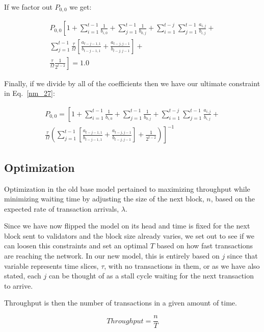 \documentclass[conference]{IEEEtran}
\begin{document}
If we factor out $P_{0,0}$ we get:

\begin{multline}
  P_{0,0} \left[1 +  \sum_{i = 1}^{t-1}{\frac{1}{b_{i,0}}} + \sum_{j = 1}^{t-1}{\frac{1}{b_{0,j}}} + \right.
  \left.\sum_{i=1}^{t-j}{\sum_{j=1}^{t-1}{\frac{a_{i,j}}{b_{i,j}}}} + \right.\\
  \left.\sum_{j=1}^{t-1}{\frac{\tau}{\Omega}\left[\frac{a_{t-j-1,1}}{b_{t-j-1,1}} + \frac{a_{t-j,j-1}}{b_{t-j,j-1}}\right]} + \right.\\
  \left.\frac{\tau}{\Omega}\frac{1}{2^{t-2}}\right] = 1.0 \label{nm_26}
\end{multline}

Finally, if we divide by all of the coefficients then we have our ultimate constraint in Eq.~\ref{nm_27}:

\begin{multline}
  P_{0,0} = \left[1 +  \sum_{i = 1}^{t-1}{\frac{1}{b_{i,0}}} + \sum_{j = 1}^{t-1}{\frac{1}{b_{0,j}}} + 
  \sum_{i=1}^{t-j}{\sum_{j=1}^{t-1}{\frac{a_{i,j}}{b_{i,j}}}} + \right.\\
  \left.\frac{\tau}{\Omega}\left(\sum_{j=1}^{t-1}{\left[\frac{a_{t-j-1,1}}{b_{t-j-1,1}} + \frac{a_{t-j,j-1}}{b_{t-j,j-1}}\right]} + 
  \frac{1}{2^{t-2}}\right)\right]^{-1} \label{nm_27}
\end{multline}

\iffalse
\subsection{Optimization}\label{optimization}  

Optimization in the old base model pertained to maximizing throughput
while minimizing waiting time by adjusting the size of the next block, $n$,
based on the expected rate of transaction arrivals, $\lambda$. 

Since we have now flipped the model on its head and time is fixed for the next
block sent to validators and the block size already varies, we set out to see if
we can loosen this constraints and set an optimal $T$ based on how fast 
transactions are reaching the network. In our new model, this is entirely based
on $j$ since that variable represents time slices, $\tau$, with no transactions in them,
or as we have also stated, each $j$ can be thought of as a stall cycle waiting for
the next transaction to arrive.

Throughput is then the number of transactions in a given amount of time. 

\begin{equation}
  Throughput = \frac{n}{T}\label{opt_1}
\end{equation}
\end{document}
